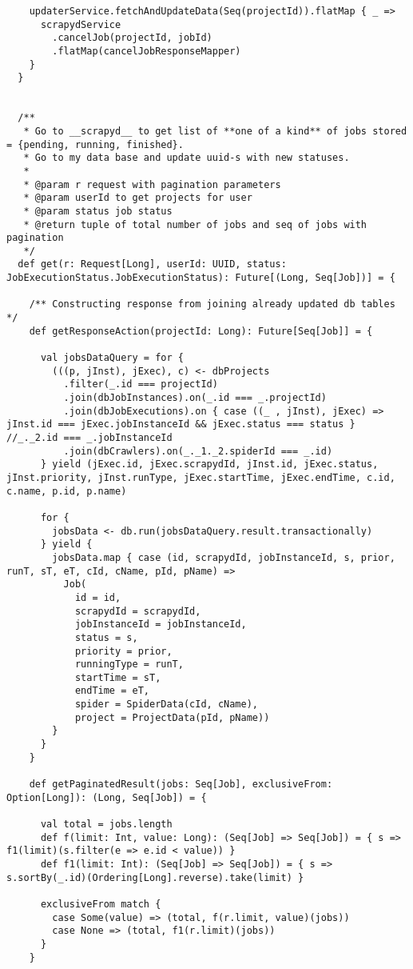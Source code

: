 \begin{lstlisting}
    updaterService.fetchAndUpdateData(Seq(projectId)).flatMap { _ =>
      scrapydService
        .cancelJob(projectId, jobId)
        .flatMap(cancelJobResponseMapper)
    }
  }


  /**
   * Go to __scrapyd__ to get list of **one of a kind** of jobs stored = {pending, running, finished}.
   * Go to my data base and update uuid-s with new statuses.
   *
   * @param r request with pagination parameters
   * @param userId to get projects for user
   * @param status job status
   * @return tuple of total number of jobs and seq of jobs with pagination
   */
  def get(r: Request[Long], userId: UUID, status: JobExecutionStatus.JobExecutionStatus): Future[(Long, Seq[Job])] = {

    /** Constructing response from joining already updated db tables */
    def getResponseAction(projectId: Long): Future[Seq[Job]] = {

      val jobsDataQuery = for {
        (((p, jInst), jExec), c) <- dbProjects
          .filter(_.id === projectId)
          .join(dbJobInstances).on(_.id === _.projectId)
          .join(dbJobExecutions).on { case ((_ , jInst), jExec) => jInst.id === jExec.jobInstanceId && jExec.status === status } //_._2.id === _.jobInstanceId
          .join(dbCrawlers).on(_._1._2.spiderId === _.id)
      } yield (jExec.id, jExec.scrapydId, jInst.id, jExec.status, jInst.priority, jInst.runType, jExec.startTime, jExec.endTime, c.id, c.name, p.id, p.name)

      for {
        jobsData <- db.run(jobsDataQuery.result.transactionally)
      } yield {
        jobsData.map { case (id, scrapydId, jobInstanceId, s, prior, runT, sT, eT, cId, cName, pId, pName) =>
          Job(
            id = id,
            scrapydId = scrapydId,
            jobInstanceId = jobInstanceId,
            status = s,
            priority = prior,
            runningType = runT,
            startTime = sT,
            endTime = eT,
            spider = SpiderData(cId, cName),
            project = ProjectData(pId, pName))
        }
      }
    }

    def getPaginatedResult(jobs: Seq[Job], exclusiveFrom: Option[Long]): (Long, Seq[Job]) = {

      val total = jobs.length
      def f(limit: Int, value: Long): (Seq[Job] => Seq[Job]) = { s => f1(limit)(s.filter(e => e.id < value)) }
      def f1(limit: Int): (Seq[Job] => Seq[Job]) = { s => s.sortBy(_.id)(Ordering[Long].reverse).take(limit) }

      exclusiveFrom match {
        case Some(value) => (total, f(r.limit, value)(jobs))
        case None => (total, f1(r.limit)(jobs))
      }
    }


\end{lstlisting}
